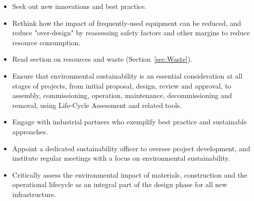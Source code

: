 \documentclass[../SustainableHEP.tex]{subfiles}
\begin{document}
\clearpage
\begin{reco2}{\currentname}
{
\begin{itemize}[leftmargin=6 mm]
\item Seek out new innovations and best practice.

\item Rethink how the impact of frequently-used equipment can be reduced, and reduce "over-design" by reassessing safety factors and other margins to reduce resource consumption.

\item Read section on resources and waste (Section~\ref{sec:Waste}).

\end{itemize}
}
{
\begin{itemize}[leftmargin=6 mm]

\item  Ensure that environmental sustainability is an essential consideration at all stages of projects, from initial proposal, design, review and approval, to assembly, commissioning, operation, maintenance, decommissioning and removal, using Life-Cycle Assessment and related tools.


\item Engage with industrial partners who exemplify best practice and sustainable approaches.

\item Appoint a dedicated sustainability officer to oversee project development, and institute regular meetings with a focus on environmental sustainability.
\end{itemize}
}
{
\begin{itemize}[leftmargin=6 mm]

\item Critically assess the environmental impact of materials, construction and the operational lifecycle as an integral part of the design phase for all new infrastructure.


\end{itemize}}
\end{reco2}
\end{document}
